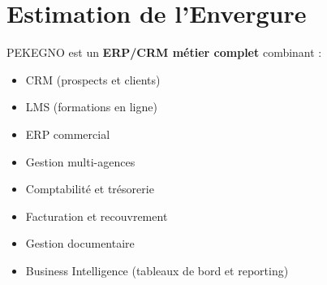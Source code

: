 \documentclass[12pt,a4paper]{report}
\begin{document}
\section{Estimation de l'Envergure}
PEKEGNO est un \textbf{ERP/CRM métier complet} combinant :
\begin{itemize}
    \item CRM (prospects et clients)
    \item LMS (formations en ligne)
    \item ERP commercial
    \item Gestion multi-agences
    \item Comptabilité et trésorerie
    \item Facturation et recouvrement
    \item Gestion documentaire
    \item Business Intelligence (tableaux de bord et reporting)
\end{itemize}
\end{document}
